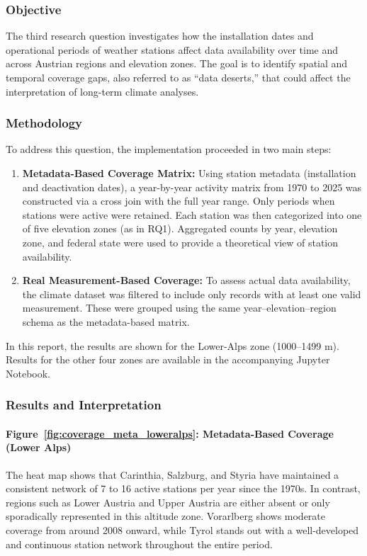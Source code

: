 \subsubsection{Objective}
The third research question investigates how the installation dates and operational periods of weather stations affect data availability over time and across Austrian regions and elevation zones. The goal is to identify spatial and temporal coverage gaps, also referred to as ``data deserts,'' that could affect the interpretation of long-term climate analyses.

\subsubsection{Methodology}

To address this question, the implementation proceeded in two main steps:

\begin{enumerate}
  \item \textbf{Metadata-Based Coverage Matrix:}  
    Using station metadata (installation and deactivation dates), a year-by-year activity matrix from 1970 to 2025 was constructed via a cross join with the full year range. Only periods when stations were active were retained. Each station was then categorized into one of five elevation zones (as in RQ1). Aggregated counts by year, elevation zone, and federal state were used to provide a theoretical view of station availability.

  \item \textbf{Real Measurement-Based Coverage:}  
    To assess actual data availability, the climate dataset was filtered to include only records with at least one valid measurement. These were grouped using the same year–elevation–region schema as the metadata-based matrix.
\end{enumerate}

In this report, the results are shown for the Lower-Alps zone (1000–1499 m). Results for the other four zones are available in the accompanying Jupyter Notebook.

\subsubsection{Results and Interpretation}

\paragraph{Figure~\ref{fig:coverage_meta_loweralps}: Metadata-Based Coverage (Lower Alps)}  
The heat map shows that Carinthia, Salzburg, and Styria have maintained a consistent network of 7 to 16 active stations per year since the 1970s. In contrast, regions such as Lower Austria and Upper Austria are either absent or only sporadically represented in this altitude zone. Vorarlberg shows moderate coverage from around 2008 onward, while Tyrol stands out with a well-developed and continuous station network throughout the entire period.

